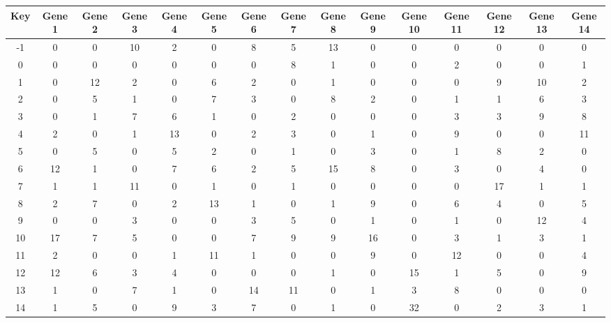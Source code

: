 \begin{tabular}{|c|c|c|c|c|c|c|c|c|c|c|c|c|c|c|}
\hline
Key & Gene 1 & Gene 2 & Gene 3 & Gene 4 & Gene 5 & Gene 6 & Gene 7 & Gene 8 & Gene 9 & Gene 10 & Gene 11 & Gene 12 & Gene 13 & Gene 14 \\
\hline
-1 & 0 & 0 & 10 & 2 & 0 & 8 & 5 & 13 & 0 & 0 & 0 & 0 & 0 & 0 \\
0 & 0 & 0 & 0 & 0 & 0 & 0 & 8 & 1 & 0 & 0 & 2 & 0 & 0 & 1 \\
1 & 0 & 12 & 2 & 0 & 6 & 2 & 0 & 1 & 0 & 0 & 0 & 9 & 10 & 2 \\
2 & 0 & 5 & 1 & 0 & 7 & 3 & 0 & 8 & 2 & 0 & 1 & 1 & 6 & 3 \\
3 & 0 & 1 & 7 & 6 & 1 & 0 & 2 & 0 & 0 & 0 & 3 & 3 & 9 & 8 \\
4 & 2 & 0 & 1 & 13 & 0 & 2 & 3 & 0 & 1 & 0 & 9 & 0 & 0 & 11 \\
5 & 0 & 5 & 0 & 5 & 2 & 0 & 1 & 0 & 3 & 0 & 1 & 8 & 2 & 0 \\
6 & 12 & 1 & 0 & 7 & 6 & 2 & 5 & 15 & 8 & 0 & 3 & 0 & 4 & 0 \\
7 & 1 & 1 & 11 & 0 & 1 & 0 & 1 & 0 & 0 & 0 & 0 & 17 & 1 & 1 \\
8 & 2 & 7 & 0 & 2 & 13 & 1 & 0 & 1 & 9 & 0 & 6 & 4 & 0 & 5 \\
9 & 0 & 0 & 3 & 0 & 0 & 3 & 5 & 0 & 1 & 0 & 1 & 0 & 12 & 4 \\
10 & 17 & 7 & 5 & 0 & 0 & 7 & 9 & 9 & 16 & 0 & 3 & 1 & 3 & 1 \\
11 & 2 & 0 & 0 & 1 & 11 & 1 & 0 & 0 & 9 & 0 & 12 & 0 & 0 & 4 \\
12 & 12 & 6 & 3 & 4 & 0 & 0 & 0 & 1 & 0 & 15 & 1 & 5 & 0 & 9 \\
13 & 1 & 0 & 7 & 1 & 0 & 14 & 11 & 0 & 1 & 3 & 8 & 0 & 0 & 0 \\
14 & 1 & 5 & 0 & 9 & 3 & 7 & 0 & 1 & 0 & 32 & 0 & 2 & 3 & 1 \\
\hline
\end{tabular}